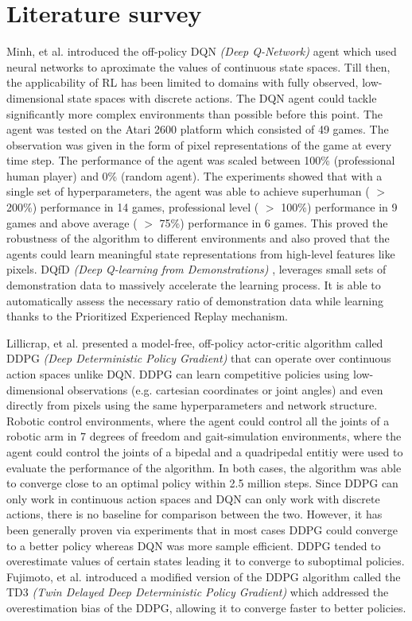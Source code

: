 \documentclass[12pt,a4paper]{article}
\begin{document}
\section{Literature survey}
Minh, et al. \cite{dqn} introduced the off-policy DQN \textit{(Deep Q-Network)} agent which
used neural networks to aproximate the values of continuous state spaces. Till then,
the applicability of RL has been limited to domains with fully observed, low-dimensional
state spaces with discrete actions. The DQN agent could tackle significantly more 
complex environments than possible before this point. The agent was tested on the 
Atari 2600 platform which consisted of 49 games. The observation was given in the 
form of pixel representations of the game at every time step. The performance of the 
agent was scaled between 100\% (professional human player) and 0\% (random agent).
The experiments showed that with a single set of hyperparameters, the agent
was able to achieve superhuman ( $>$ 200\%) performance in 14 games, professional level
( $>$ 100\%) performance in 9 games and above average ( $>$ 75\%) performance in 6 games.
This proved the robustness of the algorithm to different environments and also proved that
the agents could learn meaningful state representations from high-level features like pixels.
DQfD \textit{(Deep Q-learning from Demonstrations)} \cite{dqdf}, leverages small sets of 
demonstration data to massively accelerate the learning process. It is able to 
automatically assess the necessary ratio of demonstration data while 
learning thanks to the Prioritized Experienced Replay \cite{per} mechanism.

Lillicrap, et al. \cite{ddpg} presented a model-free, off-policy actor-critic
algorithm called DDPG \textit{(Deep Deterministic Policy Gradient)} that can operate over continuous action spaces unlike DQN.  
DDPG can learn competitive policies using low-dimensional 
observations (e.g. cartesian coordinates or joint angles) and even directly from pixels 
using the same hyperparameters and network structure. Robotic control environments, where 
the agent could control all the joints of a robotic arm in 7 degrees of freedom and gait-simulation environments, 
where the agent could control the joints of a bipedal and a quadripedal entitiy were used to evaluate the performance
of the algorithm. In both cases, the algorithm was able to converge close to an optimal policy within 2.5 million 
steps. Since DDPG can only work in continuous action spaces and DQN can only work with discrete actions, there
is no baseline for comparison between the two. However, it has been generally proven via experiments that
in most cases DDPG could converge to a better policy whereas DQN was more sample efficient. DDPG tended to overestimate
values of certain states leading it to converge to suboptimal policies. Fujimoto, et al. \cite{td3} introduced
a modified version of the DDPG algorithm called the TD3 \textit{(Twin Delayed Deep Deterministic Policy Gradient)} which addressed the 
overestimation bias of the DDPG, allowing it to converge faster to better policies.
\linebreak
\end{document}
